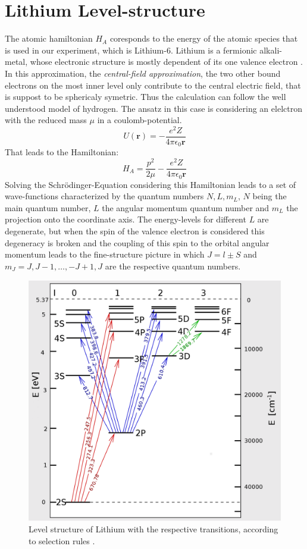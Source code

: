 \section{Lithium Level-structure}
The atomic hamiltonian $H_A$ coresponds to the energy of the atomic species that is used in our experiment, which is Lithium-6. Lithium is a fermionic alkali-metal, whose electronic structure is mostly dependent of its one valence electron \cite{gehm}. In this approximation, the \textit{central-field approximation}, the two other bound electrons on the most inner level only contribute to the central electric field, that is suppost to be sphericaly symetric. Thus the calculation can follow the well understood model of hydrogen. The ansatz in this case is considering an elelctron with the reduced mass $\mu$ in a coulomb-potential.
\begin{equation}
U(\boldsymbol{r})=-\frac{e^2Z}{4\pi\epsilon_0\boldsymbol{r}}
\end{equation}
That leads to the Hamiltonian:
\begin{equation}
H_A=\frac{p^2}{2\mu}-\frac{e^2Z}{4\pi\epsilon_0\boldsymbol{r}}
\end{equation}
Solving the Schrödinger-Equation considering this Hamiltonian leads to a set of wave-functions characterized by the quantum numbers $N,L,m_L$, $N$ being the main quantum number, $L$ the angular momentum quantum number and $m_L$ the projection onto the coordinate axis. The energy-levels for different $L$ are degenerate, but when the spin of the valence electron is considered this degeneracy is broken and the coupling of this spin to the orbital angular momentum leads to the fine-structure picture in which $J=l\pm S$  and $m_J=J,J-1,\dots,-J+1,J$ are the respective quantum numbers.
\begin{figure}[H]
\begin{center}
\includegraphics[scale=.4] {levels2}
\end{center}
\caption{Level structure of Lithium with the respective transitions, according to selection rules \cite{transitions}.}
\label{levels2}
\end{figure}
